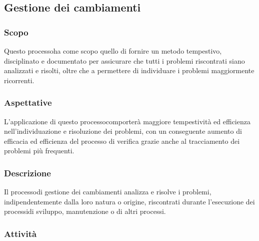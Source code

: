 \subsection{Gestione dei cambiamenti}
\subsubsection{Scopo}
Questo processo\glosp ha come scopo quello di fornire un metodo tempestivo, disciplinato e documentato per assicurare che tutti i problemi riscontrati siano analizzati e risolti, oltre che a permettere di individuare i problemi maggiormente ricorrenti.
\subsubsection{Aspettative}
L'applicazione di questo processo\glosp comporterà maggiore tempestività ed efficienza nell'individuazione e risoluzione dei problemi, con un conseguente aumento di efficacia ed efficienza del processo di verifica grazie anche al tracciamento dei problemi più frequenti.
\subsubsection{Descrizione} 
Il processo\glosp di gestione dei cambiamenti analizza e risolve i problemi, indipendentemente dalla loro natura o origine, riscontrati durante l'esecuzione dei processi\glosp di sviluppo, manutenzione o di altri processi\glosp. 
\subsubsection{Attività}
